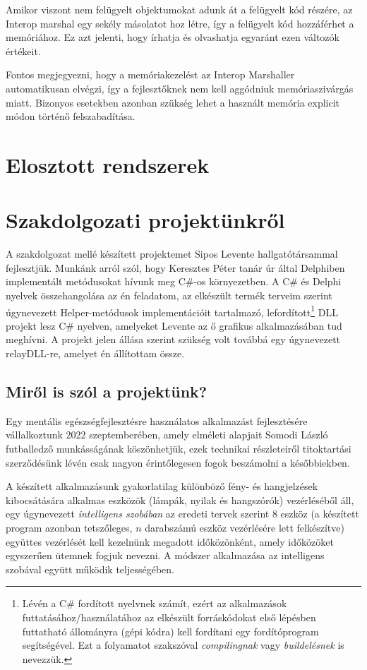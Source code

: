 \documentclass[tocnopagenum]{thesis-ekf}
\theoremstyle{definition}
\theoremstyle{remark}
\begin{document}
	Amikor viszont nem felügyelt objektumokat adunk át a felügyelt kód részére, az Interop marshal egy sekély másolatot hoz létre, így a felügyelt kód hozzáférhet a memóriához. Ez azt jelenti, hogy írhatja és olvashatja egyaránt ezen változók értékeit.
	
	Fontos megjegyezni, hogy a memóriakezelést az Interop Marshaller automatikusan elvégzi, így a fejlesztőknek nem kell aggódniuk memóriaszivárgás miatt. Bizonyos esetekben azonban szükség lehet a használt memória explicit módon történő felszabadítása.
	\cite{memhandling}
	\label{memhandling}
	\chapter{Elosztott rendszerek}
	\chapter{Szakdolgozati projektünkről}
	A szakdolgozat mellé készített projektemet Sipos Levente hallgatótársammal fejlesztjük. Munkánk arról szól, hogy Keresztes Péter tanár úr által Delphiben implementált metódusokat hívunk meg C\#-os környezetben. A C\# és Delphi nyelvek összehangolása az én feladatom, az elkészült termék terveim szerint úgynevezett Helper-metódusok implementációit tartalmazó, lefordított\footnote{Lévén a C\# fordított nyelvnek számít, ezért az alkalmazások futtatásához/használatához az elkészült forráskódokat első lépésben futtatható állományra (gépi kódra) kell fordítani egy fordítóprogram segítségével. Ezt a folyamatot szakszóval \textit{compilingnak} vagy \textit{buildelésnek} is nevezzük.} DLL projekt lesz C\# nyelven, amelyeket Levente az ő grafikus alkalmazásában tud meghívni. A projekt jelen állása szerint szükség volt továbbá egy úgynevezett relayDLL-re, amelyet én állítottam össze.
	\section{Miről is szól a projektünk?}
	
	Egy mentális egészségfejlesztésre használatos alkalmazást fejlesztésére vállalkoztunk 2022 szeptemberében, amely elméleti alapjait Somodi László futballedző munkásságának köszönhetjük, ezek technikai részleteiről titoktartási szerződésünk
	lévén csak nagyon érintőlegesen fogok beszámolni a későbbiekben. 
	
	A készített alkalmazásunk gyakorlatilag különböző fény- és hangjelzések kibocsátására alkalmas eszközök (lámpák, nyilak és hangszórók) vezérléséből áll, egy úgynevezett \emph{intelligens szobában} az eredeti tervek szerint 8 eszköz (a készített program azonban tetszőleges, $n$ darabszámú eszköz vezérlésére lett felkészítve) együttes vezérlését kell kezelnünk megadott időközönként, amely időközöket egyszerűen ütemnek fogjuk nevezni.
	A módszer alkalmazása az intelligens szobával együtt működik teljességében.
	
\end{document}
